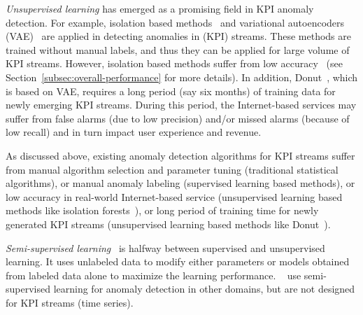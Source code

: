 \emph{Unsupervised learning} has emerged as a promising field in KPI anomaly detection.
For example, isolation based methods~\cite{ding2013anomaly} and variational autoencoders (VAE)~\cite{xu2018unsupervised} are applied in detecting anomalies in (KPI) streams.
These methods are trained without manual labels, and thus they can be applied for large volume of KPI streams.
However, isolation based methods suffer from low accuracy~\cite{zhang2018anomaly} (see Section~\ref{subsec:overall-performance} for more details).
In addition, Donut~\cite{xu2018unsupervised}, which is based on VAE,
requires a long period (say six months) of training data for newly emerging KPI streams. 
During this period, the Internet-based services may suffer from false alarms (due to low precision) and/or missed alarms (because of low recall) and in turn impact user experience and revenue.



As discussed above, existing anomaly detection algorithms for KPI streams suffer from manual algorithm selection and parameter tuning (traditional statistical algorithms), or manual anomaly labeling (supervised learning based methods), or low accuracy in real-world Internet-based service (unsupervised learning based methods like isolation forests~\cite{ding2013anomaly}), or long period of training time for newly generated KPI streams (unsupervised learning based methods like Donut~\cite{xu2018unsupervised}).

\emph{Semi-supervised learning}~\cite{chapelle2009semi} is halfway between supervised and unsupervised learning. It uses unlabeled data to modify either parameters or models obtained from labeled data alone to maximize the learning performance. ~\cite{rosenberg2005semi, ashfaq2017fuzziness, noto2012frac} use semi-supervised learning for anomaly detection in other domains, but are not designed for KPI streams (time series).

